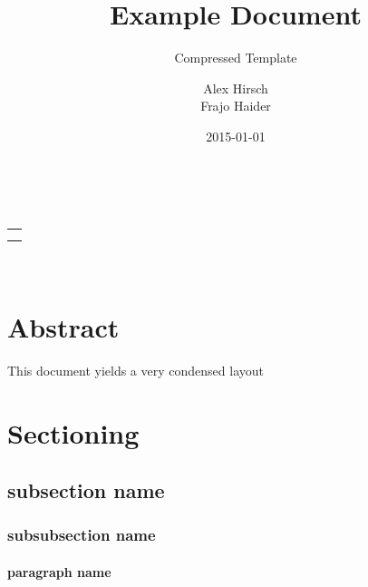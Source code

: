 \documentclass[10pt,a4paper,parskip=half]{scrartcl}
\title{Example Document}
\subtitle{Compressed Template}
\author{Alex Hirsch \\ Frajo Haider}
\date{2015-01-01}
\makeatletter
\theoremstyle{plain}
\def\maketitle{%
    \begin{minipage}[t]{0.8\linewidth}%
        \flushleft%
        \LARGE \@title\\
        \large \@subtitle
    \end{minipage}%
    \hfill%
    \begin{minipage}[t]{0.2\linewidth}%
        \flushright%
        \begin{tabular}[t]{r}\@author\\\@date\end{tabular}\\
    \end{minipage}%
}
\makeatother
\begin{document}
\maketitle

\section*{Abstract}
\label{sec:abstract}

This document yields a very condensed layout

\section{Sectioning}
\label{sec:sectioning}

 \lipsum[3]

\subsection{subsection name}
\label{sub:subsection_name}

 \lipsum[2]

 \lipsum[3]

\subsubsection{subsubsection name}
\label{ssub:subsubsection_name}

 \lipsum[3]

\paragraph{paragraph name}
\label{par:paragraph_name}

\lipsum[3]
\end{document}
